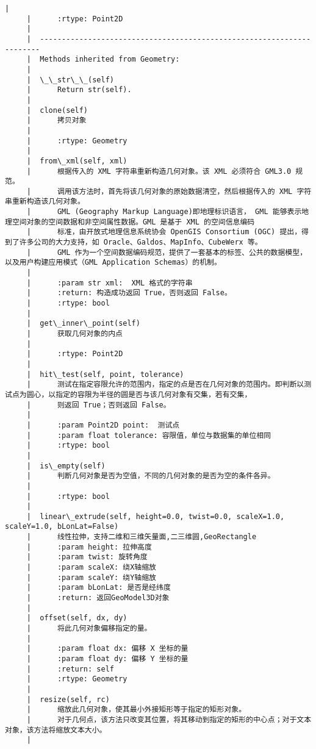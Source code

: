 \documentclass[11pt]{article}
\begin{document}
\begin{Verbatim}[commandchars=\\\{\}]
     |      
     |      :rtype: Point2D
     |  
     |  ----------------------------------------------------------------------
     |  Methods inherited from Geometry:
     |  
     |  \_\_str\_\_(self)
     |      Return str(self).
     |  
     |  clone(self)
     |      拷贝对象
     |      
     |      :rtype: Geometry
     |  
     |  from\_xml(self, xml)
     |      根据传入的 XML 字符串重新构造几何对象。该 XML 必须符合 GML3.0 规范。
     |      调用该方法时，首先将该几何对象的原始数据清空，然后根据传入的 XML 字符串重新构造该几何对象。
     |      GML (Geography Markup Language)即地理标识语言， GML 能够表示地理空间对象的空间数据和非空间属性数据。GML 是基于 XML 的空间信息编码
     |      标准，由开放式地理信息系统协会 OpenGIS Consortium (OGC) 提出，得到了许多公司的大力支持，如 Oracle、Galdos、MapInfo、CubeWerx 等。
     |      GML 作为一个空间数据编码规范，提供了一套基本的标签、公共的数据模型，以及用户构建应用模式（GML Application Schemas）的机制。
     |      
     |      :param str xml:  XML 格式的字符串
     |      :return: 构造成功返回 True，否则返回 False。
     |      :rtype: bool
     |  
     |  get\_inner\_point(self)
     |      获取几何对象的内点
     |      
     |      :rtype: Point2D
     |  
     |  hit\_test(self, point, tolerance)
     |      测试在指定容限允许的范围内，指定的点是否在几何对象的范围内。即判断以测试点为圆心，以指定的容限为半径的圆是否与该几何对象有交集，若有交集，
     |      则返回 True；否则返回 False。
     |      
     |      :param Point2D point:  测试点
     |      :param float tolerance: 容限值，单位与数据集的单位相同
     |      :rtype: bool
     |  
     |  is\_empty(self)
     |      判断几何对象是否为空值，不同的几何对象的是否为空的条件各异。
     |      
     |      :rtype: bool
     |  
     |  linear\_extrude(self, height=0.0, twist=0.0, scaleX=1.0, scaleY=1.0, bLonLat=False)
     |      线性拉伸，支持二维和三维矢量面,二三维圆,GeoRectangle
     |      :param height: 拉伸高度
     |      :param twist: 旋转角度
     |      :param scaleX: 绕X轴缩放
     |      :param scaleY: 绕Y轴缩放
     |      :param bLonLat: 是否是经纬度
     |      :return: 返回GeoModel3D对象
     |  
     |  offset(self, dx, dy)
     |      将此几何对象偏移指定的量。
     |      
     |      :param float dx: 偏移 X 坐标的量
     |      :param float dy: 偏移 Y 坐标的量
     |      :return: self
     |      :rtype: Geometry
     |  
     |  resize(self, rc)
     |      缩放此几何对象，使其最小外接矩形等于指定的矩形对象。
     |      对于几何点，该方法只改变其位置，将其移动到指定的矩形的中心点；对于文本对象，该方法将缩放文本大小。
     |      

\end{Verbatim}
\end{document}
